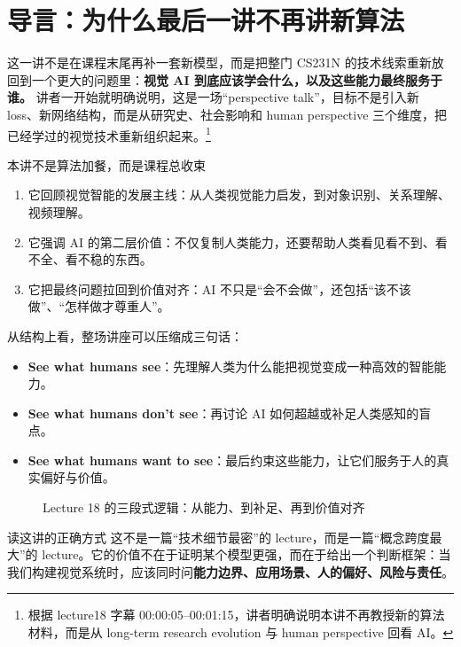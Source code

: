 \section{导言：为什么最后一讲不再讲新算法}

这一讲不是在课程末尾再补一套新模型，而是把整门 CS231N 的技术线索重新放回到一个更大的问题里：\textbf{视觉 AI 到底应该学会什么，以及这些能力最终服务于谁。} 讲者一开始就明确说明，这是一场``perspective talk''，目标不是引入新 loss、新网络结构，而是从研究史、社会影响和 human perspective 三个维度，把已经学过的视觉技术重新组织起来。\footnote{根据 lecture18 字幕 00:00:05--00:01:15，讲者明确说明本讲不再教授新的算法材料，而是从 long-term research evolution 与 human perspective 回看 AI。}

\begin{importantbox}{本讲不是算法加餐，而是课程总收束}
\begin{enumerate}
    \item 它回顾视觉智能的发展主线：从人类视觉能力启发，到对象识别、关系理解、视频理解。
    \item 它强调 AI 的第二层价值：不仅复制人类能力，还要帮助人类看见看不到、看不全、看不稳的东西。
    \item 它把最终问题拉回到价值对齐：AI 不只是``会不会做''，还包括``该不该做''、``怎样做才尊重人''。
\end{enumerate}
\end{importantbox}

从结构上看，整场讲座可以压缩成三句话：

\begin{itemize}
    \item \textbf{See what humans see}：先理解人类为什么能把视觉变成一种高效的智能能力。
    \item \textbf{See what humans don't see}：再讨论 AI 如何超越或补足人类感知的盲点。
    \item \textbf{See what humans want to see}：最后约束这些能力，让它们服务于人的真实偏好与价值。
\end{itemize}

\begin{figure}[H]
\centering
{}
\caption{Lecture 18 的三段式逻辑：从能力、到补足、再到价值对齐}
\end{figure}

\begin{knowledgebox}{读这讲的正确方式}
这不是一篇``技术细节最密''的 lecture，而是一篇``概念跨度最大''的 lecture。它的价值不在于证明某个模型更强，而在于给出一个判断框架：当我们构建视觉系统时，应该同时问\textbf{能力边界、应用场景、人的偏好、风险与责任}。
\end{knowledgebox}

